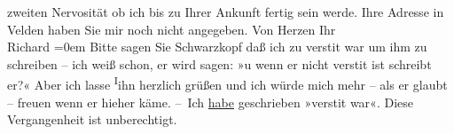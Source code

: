 \begin{ledgroupsized}[t]{13cm}
                  zweiten\strikeout{,} Nervosität ob ich bis zu Ihrer Ankunft
                  fertig sein werde. Ihre
               Adresse in Velden haben Sie mir noch nicht
               angegeben. Von Herzen\pend
           \pstart
           Ihr{\\[\baselineskip]}\spacefill\mbox{Richard}\pend
           \leftskip=0em{}\pstart
           \noindent{}Bitte sagen Sie Schwarzkopf daß ich zu
                     versti{\geminationm}t war um ihm zu schreiben – ich weiß schon,
                  er wird sagen: »u wenn er nicht {\pb}versti{\geminationm}t ist schreibt er?« Aber ich lasse \substVorne{}\textsuperscript{I}\substDazwischen{}i\substHinten{}hn herzlich grüßen und ich würde mich mehr – als er glaubt – freuen wenn
                  er hieher käme.\pend
           \pstart
           – Ich \uline{habe} geschrieben »versti{\geminationm}t war«. Diese Vergangenheit ist unberechtigt.\pend
           \endnumbering{}\end{ledgroupsized}  \newcommand{\dateiname}{L00942}\newcommand{\titel}{Richard Beer-Hofmann an Arthur Schnitzler, 14. 7. 1899}\newcommand{\editorInnen}{Martin Anton Müller und Gerd-Hermann Susen}
      